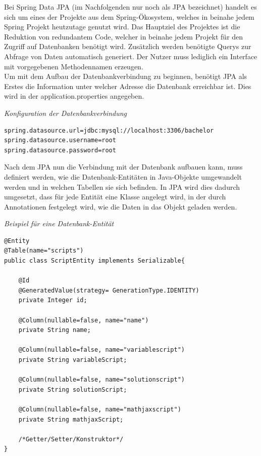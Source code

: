 Bei Spring Data JPA (im Nachfolgenden nur noch als JPA bezeichnet) handelt es sich um eines der Projekte aus dem Spring-Ökosystem, welches in beinahe jedem Spring Projekt heutzutage genutzt wird. Das Hauptziel des Projektes ist die Reduktion von redundantem Code, welcher in beinahe jedem Projekt für den Zugriff auf Datenbanken benötigt wird. Zusätzlich werden benötigte Querys zur Abfrage von Daten automatisch generiert. Der Nutzer muss lediglich ein Interface mit vorgegebenen Methodennamen erzeugen. \\

Um mit dem Aufbau der Datenbankverbindung zu beginnen, benötigt JPA als Erstes die Information unter welcher Adresse die Datenbank erreichbar ist. Dies wird in der application.properties angegeben. \\

\begin{minipage}{\textwidth}
\emph{Konfiguration der Datenbankverbindung}
\begin{lstlisting}
spring.datasource.url=jdbc:mysql://localhost:3306/bachelor
spring.datasource.username=root
spring.datasource.password=root
\end{lstlisting} 
\end{minipage}

Nach dem JPA nun die Verbindung mit der Datenbank aufbauen kann, muss definiert werden, wie die Datenbank-Entitäten in Java-Objekte umgewandelt werden und in welchen Tabellen sie sich befinden. In JPA wird dies dadurch umgesetzt, dass für jede Entität eine Klasse angelegt wird, in der durch Annotationen festgelegt wird, wie die Daten in das Objekt geladen werden. \\

\begin{minipage}{\textwidth}
\emph{Beispiel für eine Datenbank-Entität}
\begin{lstlisting}
@Entity
@Table(name="scripts")
public class ScriptEntity implements Serializable{

	@Id
	@GeneratedValue(strategy= GenerationType.IDENTITY)
	private Integer id;
	
	@Column(nullable=false, name="name")
	private String name;
	
	@Column(nullable=false, name="variablescript")
	private String variableScript;
	
	@Column(nullable=false, name="solutionscript")
	private String solutionScript;

	@Column(nullable=false, name="mathjaxscript")
	private String mathjaxScript;
	
	/*Getter/Setter/Konstruktor*/
}
\end{lstlisting}
\end{minipage}

